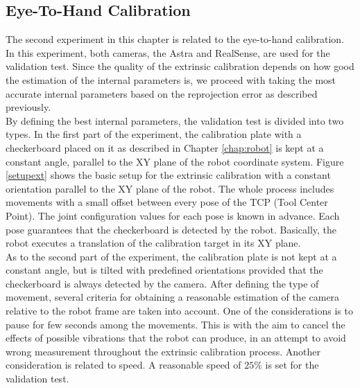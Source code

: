 \subsection{Eye-To-Hand Calibration}

The second experiment in this chapter is related to the eye-to-hand calibration. In this experiment, both cameras, the Astra and RealSense, are used for the validation test. Since the quality of the extrinsic calibration depends on how good the estimation of the internal parameters is, we proceed with taking the most accurate internal parameters based on the reprojection error as described previously. \\
By defining the best internal parameters, the validation test is divided into two types. In the first part of the experiment, the calibration plate with a checkerboard placed on it as described in Chapter \ref{chap:robot} is kept at a constant angle, parallel to the XY plane of the robot coordinate system. Figure \ref{setupext} shows the basic setup for the extrinsic calibration with a constant orientation parallel to the XY plane of the robot. The whole process includes movements with a small offset between every pose of the TCP (Tool Center Point). The joint configuration values for each pose is known in advance. Each pose guarantees that the checkerboard is detected by the robot. Basically, the robot executes a translation of the calibration target in its XY plane.\\ 

As to the second part of the experiment, the calibration plate is not kept at  a constant angle, but is tilted with predefined orientations provided that the checkerboard is always detected by the camera. After defining the type of movement, several criteria for obtaining a reasonable estimation of the camera relative to the robot frame are taken into account. One of the considerations is to pause for few seconds among the movements. This is with the aim to cancel the effects of possible vibrations that the robot can produce, in an attempt to avoid wrong measurement throughout the extrinsic calibration process. Another consideration is related to speed. A reasonable speed of $25\%$ is set for the validation test. \\

